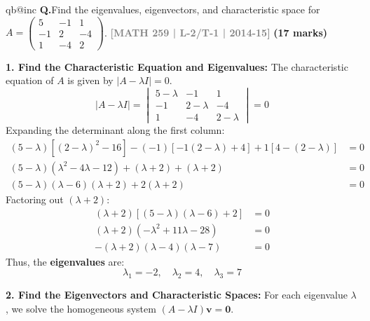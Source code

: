 \documentclass[12pt,a3paper]{article}
\makeatletter
\newcommand{\yr}[1]{\hfill\textcolor{gray}{\small\textbf{[#1]}}}
\newcommand{\mk}[1]{\textcolor{orange!70!black}{\small\textbf{(#1 marks)}}}
\newcounter{qnum}
\newcommand{\Q}[1]{%
  \csname qb@inc\endcsname
  \needspace{4\baselineskip}
  \refstepcounter{qnum}
  \vspace{6pt}
  \noindent\textbf{Q\theqnum.}\enspace #1\par
}
\makeatother
\begin{document}
\Q{Find the eigenvalues, eigenvectors, and characteristic space for $A = \begin{pmatrix} 5 & -1 & 1 \\ -1 & 2 & -4 \\ 1 & -4 & 2 \end{pmatrix}$.
\yr{MATH 259 | L-2/T-1 | 2014-15} \mk{17}}
\begin{tcolorbox}[enhanced,breakable,
  colback=cE!4,colframe=cE,boxrule=0.8pt,arc=5pt,
  title={\textbf{Answer --- Eigenvalues, Eigenvectors, and Characteristic Space}},
  fonttitle=\bfseries\color{white},colbacktitle=cE]

\textbf{1. Find the Characteristic Equation and Eigenvalues:}
The characteristic equation of $A$ is given by $|A - \lambda I| = 0$.
\[
|A - \lambda I| = \begin{vmatrix} 
5-\lambda & -1 & 1 \\ 
-1 & 2-\lambda & -4 \\ 
1 & -4 & 2-\lambda 
\end{vmatrix} = 0
\]
Expanding the determinant along the first column:
\begin{align*}
(5-\lambda)[(2-\lambda)^2 - 16] - (-1)[-1(2-\lambda) + 4] + 1[4 - (2-\lambda)] &= 0 \\
(5-\lambda)(\lambda^2 - 4\lambda - 12) + (\lambda + 2) + (\lambda + 2) &= 0 \\
(5-\lambda)(\lambda - 6)(\lambda + 2) + 2(\lambda + 2) &= 0 
\end{align*}
Factoring out $(\lambda + 2)$:
\begin{align*}
(\lambda + 2) [ (5-\lambda)(\lambda - 6) + 2 ] &= 0 \\
(\lambda + 2) ( -\lambda^2 + 11\lambda - 28 ) &= 0 \\
-(\lambda + 2) (\lambda - 4)(\lambda - 7) &= 0
\end{align*}
Thus, the \textbf{eigenvalues} are:
\[
\boxed{\lambda_1 = -2, \quad \lambda_2 = 4, \quad \lambda_3 = 7}
\]

\vspace{0.3cm}
\textbf{2. Find the Eigenvectors and Characteristic Spaces:}
For each eigenvalue $\lambda$, we solve the homogeneous system $(A - \lambda I)\mathbf{v} = \mathbf{0}$.


\end{tcolorbox}
\end{document}
